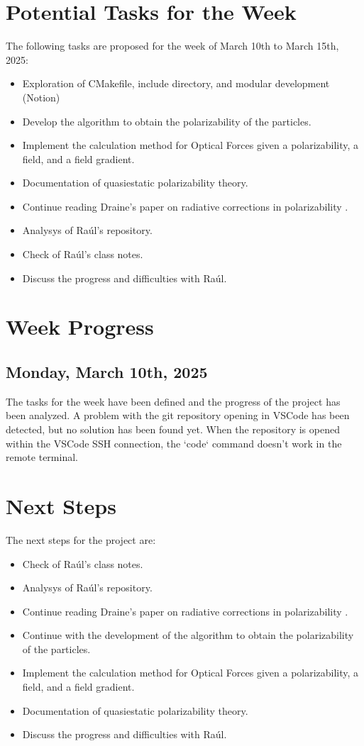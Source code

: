 \documentclass[12pt]{article}
\begin{document}
\section{Potential Tasks for the Week}
The following tasks are proposed for the week of March 10th to March 15th, 2025:
\begin{itemize}
    \item Exploration of CMakefile, include directory, and modular development (Notion) 
    \item Develop the algorithm to obtain the polarizability of the particles.
    \item Implement the calculation method for Optical Forces given a polarizability, a field, and a field gradient.
    \item Documentation of quasiestatic polarizability theory.
    \item Continue reading Draine's paper on radiative corrections in polarizability \cite{Draine1988ApJ...333..848D}.
    \item Analysys of Raúl's  repository.
    \item Check of Raúl's class notes.
    \item Discuss the progress and difficulties with Raúl.
\end{itemize}

\section{Week Progress}

\subsection{Monday, March 10th, 2025}
The tasks for the week have been defined and the progress
of the project has been analyzed. A problem with the git
repository opening in VSCode has been detected, but no
solution has been found yet. When the repository is opened
within the VSCode SSH connection, the `code` command doesn't
work in the remote terminal.

\section{Next Steps}
The next steps for the project are:
\begin{itemize}
    \item Check of Raúl's class notes.
    \item Analysys of Raúl's  repository.
    \item Continue reading Draine's paper on radiative corrections in polarizability \cite{Draine1988ApJ...333..848D}.
    \item Continue with the development of the algorithm to obtain the polarizability of the particles.
    \item Implement the calculation method for Optical Forces given a polarizability, a field, and a field gradient.
    \item Documentation of quasiestatic polarizability theory.
    \item Discuss the progress and difficulties with Raúl.
\end{itemize}

\printbibliography
\end{document}
